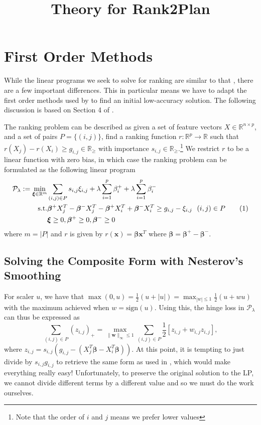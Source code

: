 \documentclass[a4paper, 11pt]{article}
\title{Theory for Rank2Plan}
\newcommand{\R}{\ensuremath{\mathbb{R}}}
\newcommand{\Pc}{\ensuremath{\mathcal{P}}}
\newcommand{\slack}{\ensuremath{\xi}}
\newcommand{\slacks}{\ensuremath{\bm{\xi}}}
\newcommand{\weight}{\ensuremath{\beta}}
\newcommand{\weights}{\ensuremath{\bm{\beta}}}
\newcommand\numberthis{\addtocounter{equation}{1}\tag{\theequation}}
\begin{document}
\maketitle

\section{First Order Methods}

While the linear programs we seek to solve for ranking are similar to that
\citet{Dedieu2022}, there are a few important differences. This in particular
means we have to adapt the first order methods used by \citet{Dedieu2022} to
find an initial low-accuracy solution. The following discussion is based on
Section 4 of \citet{Dedieu2022}.

The ranking problem can be described as given a set of feature vectors $X \in
    \R^{n \times p}$, and a set of pairs $P = \{(i, j)\}$,
find a ranking function $r: \R^p \rightarrow \R$ such that $r(X_j) - r(X_i)
    \ge g_{i,j} \in \R_{\ge}$ with importance $s_{i,j} \in \R_{\ge}$.\footnote{Note that the order of $i$
    and $j$ means we prefer lower values} We restrict $r$ to be a linear
function with zero bias, in which case the ranking problem can be formulated
as the following linear program
\begin{align*}
    \Pc_\lambda := \min_{\slacks \in \R^m} & \sum_{(i,j) \in P} s_{i, j} \slack_{i,j} + \lambda \sum_{i = 1}^p \weight^+_i + \lambda \sum_{i=1}^p \weight^-_i                                 \\
    \text{s.t.}                            & \weights^+ X_j^T - \weights^- X_j^T - \weights^+ X_i^T + \weights^- X_i^T \ge g_{i,j} - \slack_{i,j} \ \ (i, j) \in P \numberthis \label{eqn:lp} \\
                                           & \slacks \ge 0, \weights^+ \ge 0, \weights^- \ge 0
\end{align*}
where $m = |P|$ and $r$ is given by $r(\bm{x}) = \weights \bm{x}^T$ where $\weights =
    \weights^+ - \weights^-$.

\subsection{Solving the Composite Form with Nesterov's Smoothing}

For scaler $u$, we have that $\max(0, u) = \frac12 (u + |u|) = \max_{|w|
        \le 1} \frac12 (u + wu)$ with the maximum achieved when $w =
    \text{sign}(u)$. Using this, the hinge loss in $\Pc_\lambda$ can thus be expressed
as
\begin{equation}
    \sum_{(i,j) \in P} (z_{i,j})_+ = \max_{\lVert \bm{w} \rVert_\infty \le 1} \sum_{(i,j) \in P} \frac12 [z_{i,j} + w_{i,j} z_{i,j}], \label{eqn:hinge-loss-expanded}
\end{equation}
where $z_{i,j} = s_{i,j}(g_{i,j} - (X_j^T \weights - X_i^T \weights))$. At this
point, it is tempting to just divide by $s_{i,j} g_{i,j}$ to retrieve the same
form as used in \citet{Dedieu2022}, which would make everything really easy!
Unfortunately, to preserve the original solution to the LP, we cannot divide
different terms by a different value and so we must do the work ourselves.
\end{document}
